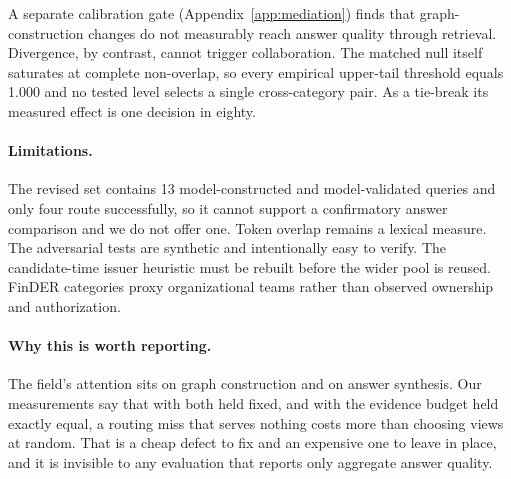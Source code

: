 \documentclass{article}
\begin{document}
A separate calibration gate (Appendix~\ref{app:mediation}) finds that graph-construction changes do not measurably reach answer quality through retrieval. Divergence, by contrast, cannot trigger collaboration. The matched null itself saturates at complete non-overlap, so every empirical upper-tail threshold equals 1.000 and no tested level selects a single cross-category pair. As a tie-break its measured effect is one decision in eighty.

\paragraph{Limitations.} The revised set contains 13 model-constructed and model-validated queries and only four route successfully, so it cannot support a confirmatory answer comparison and we do not offer one. Token overlap remains a lexical measure. The adversarial tests are synthetic and intentionally easy to verify. The candidate-time issuer heuristic must be rebuilt before the wider pool is reused. FinDER categories proxy organizational teams rather than observed ownership and authorization.

\paragraph{Why this is worth reporting.} The field's attention sits on graph construction and on answer synthesis. Our measurements say that with both held fixed, and with the evidence budget held exactly equal, a routing miss that serves nothing costs more than choosing views at random. That is a cheap defect to fix and an expensive one to leave in place, and it is invisible to any evaluation that reports only aggregate answer quality.




\appendix



\small
\end{document}
